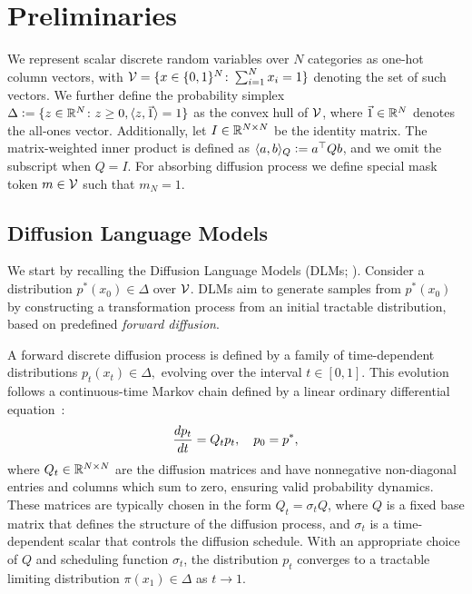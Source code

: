 \vspace{-5mm}
\section{Preliminaries}
\vspace{-3mm}
  We represent scalar discrete random variables over $N$ categories as one-hot column vectors, with ${\mathcal{V} = \{x \in \{0,1\}^N \colon \sum_{i=1}^N x_i = 1\}}$ denoting the set of such vectors. We further define the probability simplex $\Delta \vcentcolon= \{ z \in \mathbb{R}^N\colon z \ge 0, \langle z, \vec{1} \rangle = 1 \}$ as the convex hull of $\mathcal{V}$, where $\vec{1} \in \mathbb{R}^N$ denotes the all-ones vector. Additionally, let $I \in \mathbb{R}^{N \times N}$ be the identity matrix. The matrix-weighted inner product is defined as $\langle a, b \rangle_Q \vcentcolon= a^\top Q b$, and we omit the subscript when $Q = I$. For absorbing diffusion process we define special mask token $m \in \mathcal{V}$ such that $m_N = 1$.

\vspace{-2mm}
\subsection{Diffusion Language Models}
\label{sec:discrete diffusion models}
\vspace{-3mm}
  We start by recalling the Diffusion Language Models (DLMs; \citealp{austin2021structured, campbell2022continuous, lou2024discrete}). Consider a distribution $p^*(x_0) \in \Delta$ over $\mathcal{V}$. DLMs aim to generate samples from $p^*(x_0)$ by constructing a transformation process from an initial tractable distribution, based on predefined \textit{forward diffusion}.

  A forward discrete diffusion process is defined by a family of time-dependent distributions $p_t(x_t) \in \Delta,$ evolving over the interval $t \in [0, 1].$ This evolution follows a continuous-time Markov chain defined by a linear ordinary differential equation~\citep{anderson2012continuous, campbell2022continuous, lou2024discrete}:
\vspace{-2mm}
  \begin{equation}
    \frac{dp_t}{dt} = Q_t p_t, \quad p_0 = p^*,
  \label{eq:forward diffusion}
    \vspace{-0.5mm}
  \end{equation}
  where $Q_t \in \mathbb{R}^{N \times N}$ are the diffusion matrices and have nonnegative non-diagonal entries and columns which sum to zero, ensuring valid probability dynamics. These matrices are typically chosen in the form $Q_t = \sigma_t Q$, where $Q$ is a fixed base matrix that defines the structure of the diffusion process, and $\sigma_t$ is a time-dependent scalar that controls the diffusion schedule. With an appropriate choice of $Q$ and scheduling function $\sigma_t$, the distribution $p_t$ converges to a tractable limiting distribution $\pi(x_1) \in \Delta$ as $t \to 1$.

